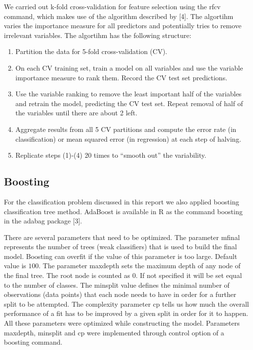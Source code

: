 \documentclass{article}
\begin{document}
We carried out k-fold cross-validation for feature selection using the {\selectfont rfcv} command, which makes use of the algorithm described by [4].  The algortihm varies the importance measure for all predictors and potentially tries to remove irrelevant variables. The algortihm has the following structure:
\begin{enumerate}
\item Partition the data for 5-fold cross-validation (CV).
\item On each CV training set, train a model on all variables and use the variable
importance measure to rank them. Record the CV test set predictions.
\item Use the variable ranking to remove the least important half of the variables
and retrain the model, predicting the CV test set. Repeat removal of half of
the variables until there are about 2 left.
\item Aggregate results from all 5 CV partitions and compute the error rate (in
classification) or mean squared error (in regression) at each step of halving.
\item Replicate steps (1)-(4) 20 times to “smooth out” the variability.
\end{enumerate}

\subsection{Boosting}

For the classification problem discussed in this report we also applied boosting classification tree method. AdaBoost is available in R as the command {\selectfont boosting} in the {\selectfont adabag} package [3].

There are several parameters that need to be optimized. The parameter {\selectfont mfinal} represents the number of trees (weak classifiers) that is used to build the final model. Boosting can overfit if the value of this parameter is too large. Default value is $100$. The parameter {\selectfont maxdepth} sets the maximum depth of any node of the final tree. The root node is counted as $0$. If not specified it will be set equal to the number of classes. The {\selectfont minsplit} value defines the minimal number of observations (data points) that each node needs to have in order for a further split to be attempted. The complexity parameter {\selectfont cp} tells us how much the overall performance of a fit has to be improved by a given split in order for it to happen. All these parameters were optimized while constructing the model. Parameters {\selectfont maxdepth}, {\selectfont minsplit} and {\selectfont cp} were implemented through {\selectfont control} option of a {\selectfont boosting} command.
\end{document}
